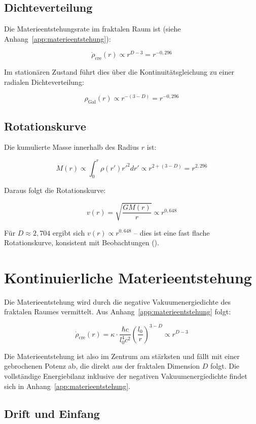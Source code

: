 \subsection{Dichteverteilung}
\label{sub:kosmo_dichte}

Die Materieentstehungsrate im fraktalen Raum ist (siehe Anhang~\ref{app:materieentstehung}):

\[
\dot{\rho}_{\text{cre}}(r) \propto r^{D-3} = r^{-0,296}
\]

Im stationären Zustand führt dies über die Kontinuitätsgleichung zu einer radialen Dichteverteilung:

\[
\rho_{\text{Gal}}(r) \propto r^{-(3-D)} = r^{-0,296}
\]

\subsection{Rotationskurve}
\label{sub:kosmo_rotation}

Die kumulierte Masse innerhalb des Radius \( r \) ist:

\[
M(r) \propto \int_0^r \rho(r') r'^2 dr' \propto r^{2 + (3-D)} = r^{2,296}
\]

Daraus folgt die Rotationskurve:

\[
v(r) = \sqrt{\frac{GM(r)}{r}} \propto r^{0,648}
\]

Für \( D \approx 2,704 \) ergibt sich \( v(r) \propto r^{0,648} \) – dies ist eine fast flache Rotationskurve, konsistent mit Beobachtungen (\cite{Rubin1970}).

\section{Kontinuierliche Materieentstehung}
\label{sec:kosmo_materieentstehung}

Die Materieentstehung wird durch die negative Vakuumenergiedichte des fraktalen Raumes vermittelt. Aus Anhang~\ref{app:materieentstehung} folgt:

\[
\dot{\rho}_{\text{cre}}(r) = \kappa \cdot \frac{\hbar c}{l_0^4 c^2} \left( \frac{l_0}{r} \right)^{3-D} \propto r^{D-3}
\]

Die Materieentstehung ist also im Zentrum am stärksten und fällt mit einer gebrochenen Potenz ab, die direkt aus der fraktalen Dimension \( D \) folgt. Die vollständige Energiebilanz inklusive der negativen Vakuumenergiedichte findet sich in Anhang~\ref{app:materieentstehung}.

\subsection{Drift und Einfang}
\label{sub:kosmo_drift_einfang}

